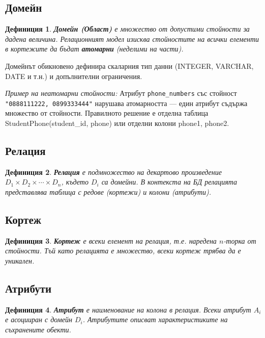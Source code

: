 \documentclass{scrartcl}
\newtheorem{definition}{Дефиниция}
\begin{document}
\begin{FlushLeft}
\subsection{Домейн}

\begin{definition}
\textbf{\textit{Домейн (Област)}} е множество от допустими стойности за дадена величина. Релационният модел изисква стойностите на всички елементи в кортежите да бъдат \textbf{атомарни} (неделими на части).
\end{definition}

Домейнът обикновено дефинира скаларния тип данни (INTEGER, VARCHAR, DATE и т.н.) и допълнителни ограничения.

\textit{Пример на неатомарни стойности:} Атрибут \texttt{phone\_numbers} със стойност \texttt{"0888111222, 0899333444"} нарушава атомарността --- един атрибут съдържа множество от стойности. Правилното решение е отделна таблица StudentPhone(student\_id, phone) или отделни колони phone1, phone2.

\subsection{Релация}

\begin{definition}
\textbf{\textit{Релация}} е подмножество на декартово произведение $D_1 \times D_2 \times \cdots \times D_n$, където $D_i$ са домейни. В контекста на БД релацията представлява таблица с редове (кортежи) и колони (атрибути).
\end{definition}

\subsection{Кортеж}

\begin{definition}
\textbf{\textit{Кортеж}} е всеки елемент на релация, т.е. наредена $n$-торка от стойности. Тъй като релацията е множество, всеки кортеж трябва да е уникален.
\end{definition}

\subsection{Атрибути}

\begin{definition}
\textbf{\textit{Атрибут}} е наименование на колона в релация. Всеки атрибут $A_i$ е асоцииран с домейн $D_i$. Атрибутите описват характеристиките на съхранените обекти.
\end{definition}


\end{FlushLeft}
\end{document}
